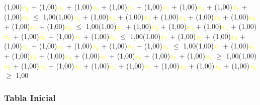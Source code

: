 \documentclass{beamer}
\newcommand\tab[1][1cm]{\hspace*{#1}}
\begin{document}
\begin{frame}\tab (1,00)\textcolor{yellow}{$x_{1}$} + (1,00)\textcolor{yellow}{$x_{2}$} + (1,00)\textcolor{yellow}{$x_{3}$} + (1,00)\textcolor{yellow}{$x_{4}$} + (1,00)\textcolor{yellow}{$x_{5}$} + (1,00)\textcolor{yellow}{$x_{6}$} + (1,00)\textcolor{yellow}{$x_{7}$} + (1,00)\textcolor{yellow}{$x_{8}$} $\leq$ 1,00\newline\newline\tab (1,00)\textcolor{yellow}{$x_{1}$} + (1,00)\textcolor{yellow}{$x_{2}$} + (1,00)\textcolor{yellow}{$x_{3}$} + (1,00)\textcolor{yellow}{$x_{4}$} + (1,00)\textcolor{yellow}{$x_{5}$} + (1,00)\textcolor{yellow}{$x_{6}$} + (1,00)\textcolor{yellow}{$x_{7}$} + (1,00)\textcolor{yellow}{$x_{8}$} $\leq$ 1,00\newline\newline\tab (1,00)\textcolor{yellow}{$x_{1}$} + (1,00)\textcolor{yellow}{$x_{2}$} + (1,00)\textcolor{yellow}{$x_{3}$} + (1,00)\textcolor{yellow}{$x_{4}$} + (1,00)\textcolor{yellow}{$x_{5}$} + (1,00)\textcolor{yellow}{$x_{6}$} + (1,00)\textcolor{yellow}{$x_{7}$} + (1,00)\textcolor{yellow}{$x_{8}$} $\leq$ 1,00\newline\newline\tab (1,00)\textcolor{yellow}{$x_{1}$} + (1,00)\textcolor{yellow}{$x_{2}$} + (1,00)\textcolor{yellow}{$x_{3}$} + (1,00)\textcolor{yellow}{$x_{4}$} + (1,00)\textcolor{yellow}{$x_{5}$} + (1,00)\textcolor{yellow}{$x_{6}$} + (1,00)\textcolor{yellow}{$x_{7}$} + (1,00)\textcolor{yellow}{$x_{8}$} $\leq$ 1,00\newline\newline\tab (1,00)\textcolor{yellow}{$x_{1}$} + (1,00)\textcolor{yellow}{$x_{2}$} + (1,00)\textcolor{yellow}{$x_{3}$} + (1,00)\textcolor{yellow}{$x_{4}$} + (1,00)\textcolor{yellow}{$x_{5}$} + (1,00)\textcolor{yellow}{$x_{6}$} + (1,00)\textcolor{yellow}{$x_{7}$} + (1,00)\textcolor{yellow}{$x_{8}$} $\geq$ 1,00\newline\newline\tab (1,00)\textcolor{yellow}{$x_{1}$} + (1,00)\textcolor{yellow}{$x_{2}$} + (1,00)\textcolor{yellow}{$x_{3}$} + (1,00)\textcolor{yellow}{$x_{4}$} + (1,00)\textcolor{yellow}{$x_{5}$} + (1,00)\textcolor{yellow}{$x_{6}$} + (1,00)\textcolor{yellow}{$x_{7}$} + (1,00)\textcolor{yellow}{$x_{8}$} $\geq$ 1,00\newline\newline\end{frame}\begin{frame}
\frametitle{Tabla Inicial}
{
\centering
\begin{tabu}{|@{}*{22}{p{1.0cm}@{}|}}

\end{tabu}}
\end{frame}
\end{document}
